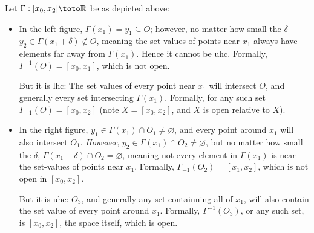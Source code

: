 \documentclass{article}
\begin{document}
\begin{figure}[!ht]
\end{figure}

Let $\Gamma: [x_0, x_2] \toto \mathbb{R}$ be as depicted above:
\begin{itemize}[label=$\bullet$]
  \item In the left figure, $\Gamma(x_1) = y_1 \subseteq O$; however, no matter how small the $\delta$ $y_2 \in \Gamma(x_1 + \delta) \notin O$, meaning the set values of points near $x_1$ always have elements far away from $\Gamma(x_1)$. Hence it cannot be uhc. Formally, $\Gamma^{-1}(O) = [x_0, x_1]$, which is not open.

    But it is lhc: The set values of every point near $x_1$ will intersect $O$, and generally every set intersecting $\Gamma(x_1)$. Formally, for any such set $\Gamma_{-1}(O) = [x_0, x_2]$ (note $X = [x_0, x_2]$, and $X$ is open relative to $X$).

  \item In the right figure, $y_1 \in \Gamma(x_1) \cap O_1 \ne \varnothing$, and every point around $x_1$ will also intersect $O_1$. \textit{However}, $y_2 \in \Gamma(x_1) \cap O_2 \ne \varnothing$, but no matter how small the $\delta$, $\Gamma(x_1 - \delta) \cap O_2 = \varnothing$, meaning not every element in $\Gamma(x_1)$ is near the set-values of points near $x_1$. Formally, $\Gamma_{-1}(O_2) = [x_1, x_2]$, which is not open in $[x_0, x_2]$.

    But it is uhc: $O_3$, and generally any set containning all of $x_1$, will also contain the set value of every point around $x_1$. Formally, $\Gamma^{-1}(O_3)$, or any such set, is $[x_0, x_2]$, the space itself, which is open.
\end{itemize}
\end{document}
